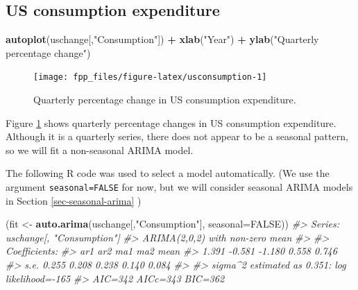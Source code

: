 \documentclass[]{book}
\newenvironment{Shaded}{\begin{snugshade}}{\end{snugshade}}
\newcommand{\CommentTok}[1]{\textcolor[rgb]{0.56,0.35,0.01}{\textit{#1}}}
\newcommand{\DataTypeTok}[1]{\textcolor[rgb]{0.13,0.29,0.53}{#1}}
\newcommand{\KeywordTok}[1]{\textcolor[rgb]{0.13,0.29,0.53}{\textbf{#1}}}
\newcommand{\NormalTok}[1]{#1}
\newcommand{\OperatorTok}[1]{\textcolor[rgb]{0.81,0.36,0.00}{\textbf{#1}}}
\newcommand{\OtherTok}[1]{\textcolor[rgb]{0.56,0.35,0.01}{#1}}
\newcommand{\StringTok}[1]{\textcolor[rgb]{0.31,0.60,0.02}{#1}}
\begin{document}
\hypertarget{us-consumption-expenditure}{%
\subsection*{US consumption expenditure}\label{us-consumption-expenditure}}

\begin{Shaded}
\begin{Highlighting}[]
\KeywordTok{autoplot}\NormalTok{(uschange[,}\StringTok{"Consumption"}\NormalTok{]) }\OperatorTok{+}
\StringTok{  }\KeywordTok{xlab}\NormalTok{(}\StringTok{"Year"}\NormalTok{) }\OperatorTok{+}\StringTok{ }\KeywordTok{ylab}\NormalTok{(}\StringTok{"Quarterly percentage change"}\NormalTok{)}
\end{Highlighting}
\end{Shaded}

\begin{figure}

{\centering \texttt{[image: fpp\_files/figure-latex/usconsumption-1]} 

}

\caption{Quarterly percentage change in US consumption expenditure.}\label{fig:usconsumption}
\end{figure}

Figure \ref{fig:usconsumption} shows quarterly percentage changes in US consumption expenditure. Although it is a quarterly series, there does not appear to be a seasonal pattern, so we will fit a non-seasonal ARIMA model.

The following R code was used to select a model automatically. (We use the argument \texttt{seasonal=FALSE} for now, but we will consider seasonal ARIMA models in Section \ref{sec-seasonal-arima} )

\begin{Shaded}
\begin{Highlighting}[]
\NormalTok{(fit <-}\StringTok{ }\KeywordTok{auto.arima}\NormalTok{(uschange[,}\StringTok{"Consumption"}\NormalTok{], }\DataTypeTok{seasonal=}\OtherTok{FALSE}\NormalTok{))}
\CommentTok{#> Series: uschange[, "Consumption"] }
\CommentTok{#> ARIMA(2,0,2) with non-zero mean }
\CommentTok{#> }
\CommentTok{#> Coefficients:}
\CommentTok{#>         ar1     ar2     ma1    ma2   mean}
\CommentTok{#>       1.391  -0.581  -1.180  0.558  0.746}
\CommentTok{#> s.e.  0.255   0.208   0.238  0.140  0.084}
\CommentTok{#> }
\CommentTok{#> sigma^2 estimated as 0.351:  log likelihood=-165}
\CommentTok{#> AIC=342   AICc=343   BIC=362}
\end{Highlighting}
\end{Shaded}
\end{document}

